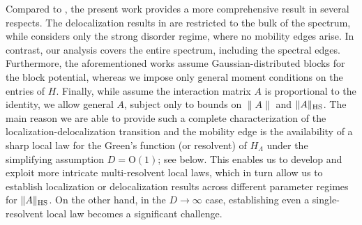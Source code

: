 \documentclass[10pt,reqno]{amsart}
\numberwithin{equation}{section}
\numberwithin{figure}{section}
\theoremstyle{plain} %
\theoremstyle{definition} %
\renewcommand{\txt}[1]{\text{\rm{#1}}}
\newcommand{\OO}{\mathrm{O}}
\newcommand{\HS}{\txt{HS}}
\numberwithin{equation}{section}
\begin{document}
Compared to \cite{yang2025delocalizationgeneralclassrandom,truong2025localizationlengthfinitevolumerandom,Wegner}, the present work provides a more comprehensive result in several respects. 
The delocalization results in \cite{yang2025delocalizationgeneralclassrandom,truong2025localizationlengthfinitevolumerandom} are restricted to the bulk of the spectrum, while \cite{Wegner} considers only the strong disorder regime, where no mobility edges arise. In contrast, our analysis covers the entire spectrum, including the spectral edges. Furthermore, the aforementioned works assume Gaussian-distributed blocks for the block potential, whereas we impose only general moment conditions on the entries of $H$. Finally, while \cite{yang2025delocalizationgeneralclassrandom,Wegner} assume the interaction matrix $A$ is proportional to the identity, we allow general $A$, subject only to bounds on $\|A\|$ and $\|A\|_{\HS}$. 
The main reason we are able to provide such a complete characterization of the localization-delocalization transition and the mobility edge is the availability of a sharp local law for the Green’s function (or resolvent) of $H_\Lambda$ under the simplifying assumption $D=\OO(1)$; see  below. 
This enables us to develop and exploit more intricate multi-resolvent local laws, which in turn allow us to establish localization or delocalization results across different parameter regimes for $\|A\|_{\HS}$. 
On the other hand, in the $D\to \infty$ case, establishing even a single-resolvent local law becomes a significant challenge.
\end{document}
